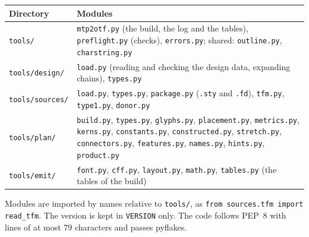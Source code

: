 \documentclass[10pt]{article}
\newcommand\file[1]{\texttt{#1}}
\newcommand\code[1]{\texttt{#1}}
\begin{document}
\begin{center}
\begin{tabularx}{\textwidth}{lX}
\toprule
Directory & Modules \\
\midrule
\file{tools/} & \file{mtp2otf.py} (the build, the log and the
  tables),
  \file{preflight.py} (checks), \file{errors.py}; shared:
  \file{outline.py}, \file{charstring.py} \\
\file{tools/design/} & \file{load.py} (reading and checking the design
  data, expanding chains), \file{types.py} \\
\file{tools/sources/} & \file{load.py}, \file{types.py},
  \file{package.py} (\file{.sty} and \file{.fd}), \file{tfm.py},
  \file{type1.py}, \file{donor.py} \\
\file{tools/plan/} & \file{build.py}, \file{types.py}, \file{glyphs.py},
  \file{placement.py}, \file{metrics.py}, \file{kerns.py},
  \file{constants.py}, \file{constructed.py}, \file{stretch.py},
  \file{connectors.py}, \file{features.py}, \file{names.py},
  \file{hints.py}, \file{product.py} \\
\file{tools/emit/} & \file{font.py}, \file{cff.py}, \file{layout.py},
  \file{math.py}, \file{tables.py} (the tables of the build) \\
\bottomrule
\end{tabularx}
\end{center}

Modules are imported by names relative to \file{tools/}, as
\code{from sources.tfm import read\_tfm}.  The version is kept in
\file{VERSION} only.  The code follows PEP~8 with lines of at most 79
characters and passes pyflakes.



\end{document}
